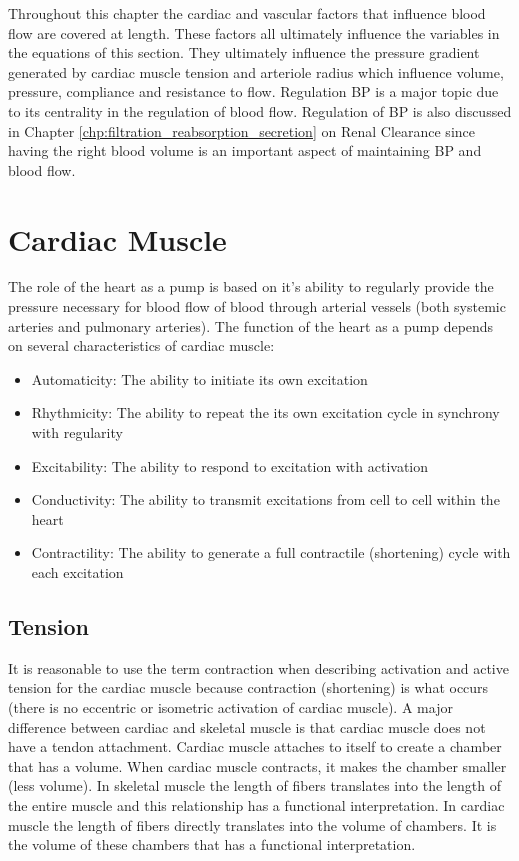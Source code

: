 Throughout this chapter the cardiac and vascular factors that influence blood flow are covered at length. These factors all ultimately influence the variables in the equations of this section. They ultimately influence the pressure gradient generated by cardiac muscle tension and arteriole radius which influence volume, pressure, compliance and resistance to flow. Regulation BP is a major topic due to its centrality in the regulation of blood flow. Regulation of BP is also discussed in Chapter \ref{chp:filtration_reabsorption_secretion} on Renal Clearance since having the right blood volume is an important aspect of maintaining BP and blood flow.

\section{Cardiac Muscle}

The role of the heart as a pump is based on it's ability to regularly provide the pressure necessary for blood flow of blood through arterial vessels (both systemic arteries and pulmonary arteries). The function of the heart as a pump depends on several characteristics of cardiac muscle:

\begin{itemize}
    
    \item Automaticity: The ability to initiate its own excitation
    \item Rhythmicity: The ability to repeat the its own excitation cycle in synchrony with regularity
    \item Excitability: The ability to respond to excitation with activation
    \item Conductivity: The ability to transmit excitations from cell to cell within the heart
    \item Contractility: The ability to generate a full contractile (shortening) cycle with each excitation
 
\end{itemize}

\subsection{Tension}

It is reasonable to use the term contraction when describing activation and active tension for the cardiac muscle because contraction (shortening) is what occurs (there is no eccentric or isometric activation of cardiac muscle). A major difference between cardiac and skeletal muscle is that cardiac muscle does not have a tendon attachment. Cardiac muscle attaches to itself to create a chamber that has a volume. When cardiac muscle contracts, it makes the chamber smaller (less volume). In skeletal muscle the length of fibers translates into the length of the entire muscle and this relationship has a functional interpretation. In cardiac muscle the length of fibers directly translates into the volume of chambers. It is the volume of these chambers that has a functional interpretation. 

